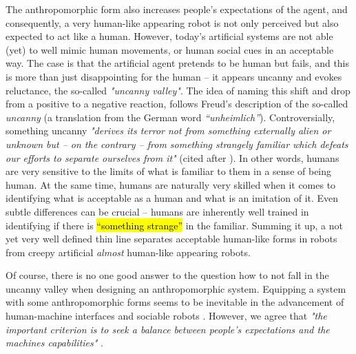 \documentclass{frontiersSCNS} %
\begin{document}
The anthropomorphic form also 
increases people's expectations of the agent, and consequently, a very human-like 
appearing robot is not only perceived but also expected to act like a human. However, today's artificial systems are 
not able (yet) to well mimic human movements, or human social cues in an acceptable way. 
The case is that the artificial agent pretends to be human but fails, and this is 
more than just disappointing for the 
human -- it appears uncanny and evokes reluctance, the so-called 
\textit{"uncanny valley"}. The idea of naming this shift and drop from a positive to a negative reaction,
follows Freud's description of the so-called \textit{uncanny} (a translation from the German word 
\textit{``unheimlich''}). Controversially, something uncanny \textit{"derives its terror not from 
something externally alien or unknown but -- on the contrary -- from something 
strangely familiar which defeats our efforts to separate ourselves from it"} (cited 
after \cite{hegel_understanding_2008}).
In other words, humans are very sensitive to the limits of what is familiar to them 
in a sense of being human. At the same time, humans are naturally very skilled when 
it comes to identifying what is acceptable as a human and what is an imitation 
of it. Even subtle differences can be crucial -- humans are inherently well trained 
in identifying if there is \hl{``something strange''} in the familiar.
Summing it up, a not yet very well defined thin line separates acceptable human-like forms in 
robots from creepy artificial \textit{almost} human-like appearing robots.

 
Of course, there is no one good answer to the question how to not fall in the 
uncanny valley when designing an anthropomorphic system. Equipping a system with 
some anthropomorphic forms seems to be inevitable 
\cite{duffy_anthropomorphism_2002} in the advancement of human-machine interfaces 
and sociable robots \citep{breazeal_sociable_2000}. However, we agree that 
\textit{"the important criterion is to seek a balance between people's expectations 
and the machines capabilities"} \citep{duffy_anthropomorphism_2002}. 






\end{document}
